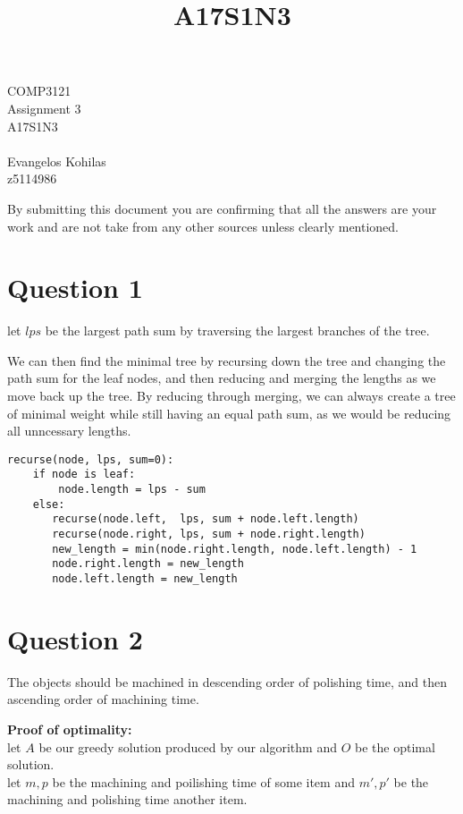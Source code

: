 \documentclass{article}
\title{A17S1N3}
\begin{document}
\begin{center}
    \begin{LARGE}
        COMP3121\\
        Assignment 3\\
        A17S1N3\\
        \hrulefill\\
        Evangelos Kohilas\\
        z5114986\\
        \hrulefill
    \end{LARGE}

    \begin{large}
        By submitting this document you are confirming that all the answers are your work and are not take from any other sources unless clearly mentioned.
    \end{large}

\end{center}

\section*{Question 1}
let $lps$ be the largest path sum by traversing the largest branches of the tree.

We can then find the minimal tree by recursing down the tree and changing the path sum for the leaf nodes, and then reducing and merging the lengths as we move back up the tree. By reducing through merging, we can always create a tree of minimal weight while still having an equal path sum, as we would be reducing all unncessary lengths.

\begin{verbatim}
recurse(node, lps, sum=0):
    if node is leaf:
        node.length = lps - sum
    else:
       recurse(node.left,  lps, sum + node.left.length)
       recurse(node.right, lps, sum + node.right.length)
       new_length = min(node.right.length, node.left.length) - 1
       node.right.length = new_length
       node.left.length = new_length
\end{verbatim}

\section*{Question 2}
The objects should be machined in descending order of polishing time, and then ascending order of machining time.

\textbf{Proof of optimality:}\\
let $A$ be our greedy solution produced by our algorithm and $O$ be the optimal solution.\\
let $m, p$ be the machining and poilishing time of some item and $m', p'$ be the machining and polishing time another item.
\end{document}
